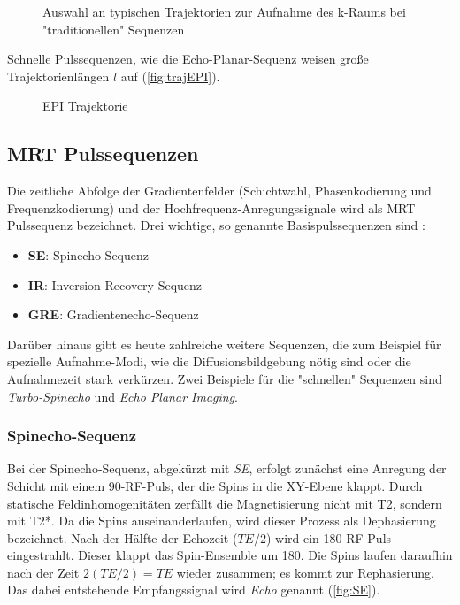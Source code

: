 \begin{figure}[H]
	\centering
	\hfill
	\hfill
	\caption{Auswahl an typischen Trajektorien zur Aufnahme des k-Raums bei "traditionellen" Sequenzen}
	\label{fig:trajClassic}
\end{figure}

Schnelle Pulssequenzen, wie die Echo-Planar-Sequenz weisen große Trajektorienlängen $l$ auf (\autoref{fig:trajEPI}).

\begin{figure}[H]
	\centering
	\caption[Echoplanar Sequenz]{EPI Trajektorie}
	\label{fig:trajEPI}
\end{figure} 

\subsection{MRT Pulssequenzen}
Die zeitliche Abfolge der Gradientenfelder (Schichtwahl, Phasenkodierung und Frequenzkodierung) und der Hochfrequenz-Anregungssignale wird als MRT Pulssequenz bezeichnet.
Drei wichtige, so genannte Basispulssequenzen sind \cite[S. 999]{Weishaupt2014}:
\begin{itemize}
	\item \textbf{SE}: Spinecho-Sequenz
	\item \textbf{IR}: Inversion-Recovery-Sequenz
	\item \textbf{GRE}: Gradientenecho-Sequenz
\end{itemize}

Darüber hinaus gibt es heute zahlreiche weitere Sequenzen, die zum Beispiel für spezielle Aufnahme-Modi, wie die Diffusionsbildgebung nötig sind oder die Aufnahmezeit stark verkürzen. Zwei Beispiele für die "schnellen" Sequenzen sind \textit{Turbo-Spinecho} und \textit{Echo Planar Imaging}.


\subsubsection{Spinecho-Sequenz}
Bei der Spinecho-Sequenz, abgekürzt mit \textit{SE}, erfolgt zunächst eine Anregung der Schicht mit einem 90\degree-RF-Puls, der die Spins in die XY-Ebene klappt. Durch statische Feldinhomogenitäten zerfällt die Magnetisierung nicht mit T2, sondern mit T2*. Da die Spins auseinanderlaufen, wird dieser Prozess als Dephasierung bezeichnet. Nach der Hälfte der Echozeit ($TE/2$) wird ein 180\degree-RF-Puls eingestrahlt. Dieser klappt das Spin-Ensemble um 180\degree. Die Spins laufen daraufhin nach der Zeit $2(TE/2) = TE$ wieder zusammen; es kommt zur Rephasierung. Das dabei entstehende Empfangssignal wird \textit{Echo} genannt (\autoref{fig:SE}).

